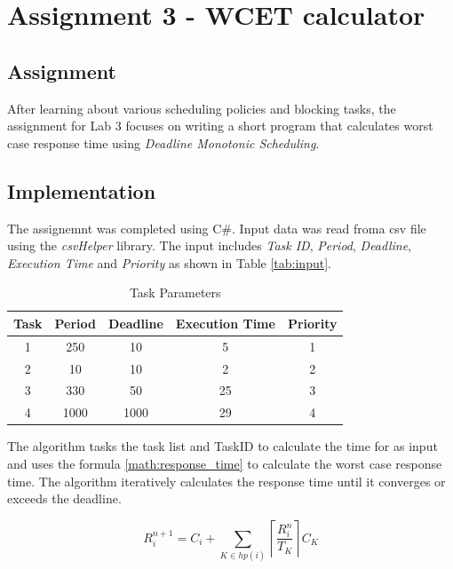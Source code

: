 \chapter{Assignment 3 - WCET calculator}
 \section{Assignment}
 After learning about various scheduling policies and blocking tasks, the assignment for Lab 3 focuses on writing a short program that calculates worst case response time using \textit{Deadline Monotonic Scheduling}. 




 \section{Implementation}
The assignemnt was completed using C\#. Input data was read froma csv file using the \textit{csvHelper} library. The input includes \textit{Task ID}, \textit{Period}, \textit{Deadline}, \textit{Execution Time} and \textit{Priority} as shown in Table \ref{tab:input}. 

\label{tab:input}
\begin{table}[h]
\centering
\begin{tabular}{|c|c|c|c|c|}
\hline
\textbf{Task} & \textbf{Period} & \textbf{Deadline} & \textbf{Execution Time} & \textbf{Priority} \\
\hline
1 & 250  & 10   & 5  & 1 \\
2 & 10   & 10   & 2  & 2 \\
3 & 330  & 50   & 25 & 3 \\
4 & 1000 & 1000 & 29 & 4 \\
\hline
\end{tabular}
\caption{Task Parameters}
\end{table}

The algorithm tasks the task list and TaskID to calculate the time for as input and uses the formula \ref{math:response_time} to calculate the worst case response time. The algorithm iteratively calculates the response time until it converges or exceeds the deadline.

\label{math:response_time}
\[
  R^{n+1}_i = C_i + \sum_{K \in hp(i)} \left\lceil \frac{R^n_i}{T_K} \right\rceil C_K
\]

